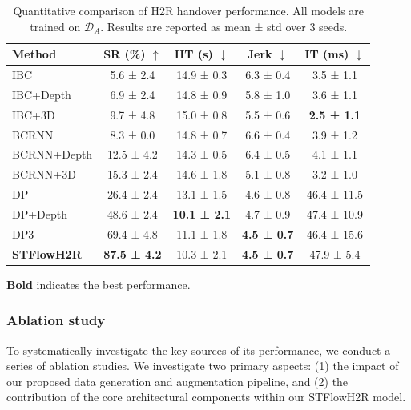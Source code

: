 \documentclass[final,5p,times,twocolumn]{elsarticle}
\begin{document}
\begin{table}[htbp]
\footnotesize
\centering
\caption{Quantitative comparison of H2R handover performance. All models are trained on $\mathcal{D}_A$. Results are reported as mean ± std over 3 seeds.}
\label{quantitative_comparison}
\begin{threeparttable}
\begin{tabular}{lcccc}
\toprule
\textbf{Method} & \textbf{SR (\%)} $\uparrow$ & \textbf{HT (s)} $\downarrow$ & \textbf{Jerk} $\downarrow$ & \textbf{IT (ms)} $\downarrow$ \\ 
\midrule
IBC                 & 5.6 ± 2.4 & 14.9 ± 0.3 & 6.3 ± 0.4 & 3.5 ± 1.1 \\
IBC+Depth           & 6.9 ± 2.4 & 14.8 ± 0.9 & 5.8 ± 1.0 & 3.6 ± 1.1 \\
IBC+3D              & 9.7 ± 4.8 & 15.0 ± 0.8 & 5.5 ± 0.6 & \textbf{2.5 ± 1.1} \\
\midrule
BCRNN               & 8.3 ± 0.0 & 14.8 ± 0.7 & 6.6 ± 0.4 & 3.9 ± 1.2 \\
BCRNN+Depth         & 12.5 ± 4.2 & 14.3 ± 0.5 & 6.4 ± 0.5 & 4.1 ± 1.1 \\
BCRNN+3D            & 15.3 ± 2.4 & 14.6 ± 1.8 & 5.1 ± 0.8 & 3.2 ± 1.0 \\
\midrule
DP                  & 26.4 ± 2.4 & 13.1 ± 1.5 & 4.6 ± 0.8 & 46.4 ± 11.5 \\
DP+Depth            & 48.6 ± 2.4 & \textbf{10.1 ± 2.1} & 4.7 ± 0.9 & 47.4 ± 10.9 \\
DP3                 & 69.4 ± 4.8 & 11.1 ± 1.8 & \textbf{4.5 ± 0.7} & 46.4 ± 15.6 \\    
\midrule
\textbf{STFlowH2R}  & \textbf{87.5 ± 4.2} & 10.3 ± 2.1 & \textbf{4.5 ± 0.7} & 47.9 ± 5.4 \\
\bottomrule
\end{tabular}
\begin{tablenotes}
\footnotesize
\item[1] \textbf{Bold} indicates the best performance.
\end{tablenotes}
\end{threeparttable}
\end{table}


\subsubsection{Ablation study}
To systematically investigate the key sources of its performance, we conduct a series of ablation studies. We investigate two primary aspects: (1) the impact of our proposed data generation and augmentation pipeline, and (2) the contribution of the core architectural components within our STFlowH2R model.
\end{document}
